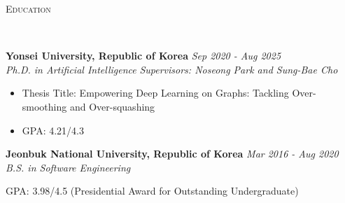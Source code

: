 \documentclass[10pt]{article}
\newenvironment{changemargin}[2]{
  \begin{list}{}{
    \setlength{\topsep}{0pt}
    \setlength{\leftmargin}{#1}
    \setlength{\rightmargin}{#2}
    \setlength{\listparindent}{\parindent}
    \setlength{\itemindent}{\parindent}
    \setlength{\parsep}{\parskip}
  }
  \item[]}{\end{list}
}
\newcommand{\lineover}{
	\begin{changemargin}{-0.05in}{-0.05in}
		\vspace*{-8pt}
		\hrulefill \\
		\vspace*{-2pt}
	\end{changemargin}
}
\newcommand{\header}[1]{
	\begin{changemargin}{-0.5in}{-0.5in}
		\scshape{#1}\\
  	\lineover
	\end{changemargin}
}
\newenvironment{body} {
	\vspace*{-16pt}
	\begin{changemargin}{-0.25in}{-0.5in}
  }
	{\end{changemargin}
}
\begin{document}
\header{Education}

\begin{body}
	\vspace{14pt}
	\textbf{Yonsei University, Republic of Korea} \hfill \emph{Sep 2020 -  Aug 2025} \\
	\emph{Ph.D. in Artificial Intelligence} \hfill \emph{Supervisors: Noseong Park and Sung-Bae Cho}\\
    \begin{itemize}
        \item Thesis Title: Empowering Deep Learning on Graphs: Tackling Over-smoothing and Over-squashing
        \item GPA: 4.21/4.3
    \end{itemize}
\end{body}

\begin{body}
	\vspace{14pt}
	\textbf{Jeonbuk National University, Republic of Korea} \hfill \emph{Mar 2016 -  Aug 2020} \\
	\emph{B.S. in Software Engineering}\\
    \item GPA: 3.98/4.5 (Presidential Award for Outstanding Undergraduate)
\end{body}
\end{document}
